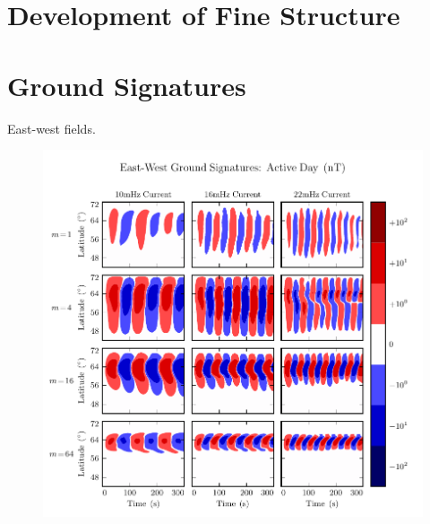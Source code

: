 

\section{Development of Fine Structure}

\section{Ground Signatures}

East-west fields. 

\begin{figure}[H]
    \centering
    \includegraphics[width=\textwidth]{figures/BfE_J_1.pdf}
    \caption[East-West Ground Signatures: Active Day]{}
    \label{fig_BfE_J_1}
\end{figure}

